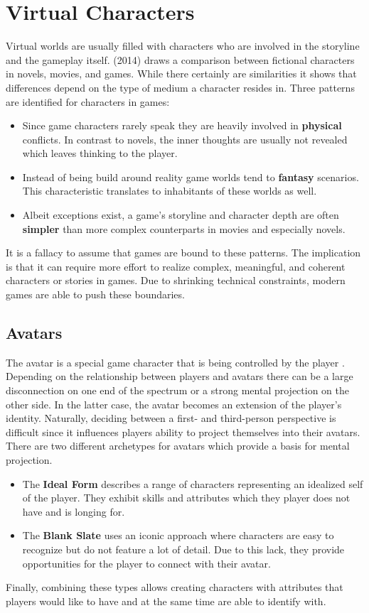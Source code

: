\section{Virtual Characters} \label{sec:virtual-characters}
Virtual worlds are usually filled with characters who are involved in the storyline and the gameplay itself.
\citeauthor{Schell2014} (2014) draws a comparison between fictional characters in novels, movies, and games.
While there certainly are similarities it shows that differences depend on the type of medium a character resides in.
Three patterns are identified for characters in games:
\begin{itemize}
    \item Since game characters rarely speak they are heavily involved in \textbf{physical} conflicts. In contrast to novels, the inner thoughts are usually not revealed which leaves thinking to the player.
    \item Instead of being build around reality game worlds tend to \textbf{fantasy} scenarios. This characteristic translates to inhabitants of these worlds as well.
    \item Albeit exceptions exist, a game's storyline and character depth are often \textbf{simpler} than more complex counterparts in movies and especially novels.
\end{itemize}
It is a fallacy to assume that games are bound to these patterns.
The implication is that it can require more effort to realize complex, meaningful, and coherent characters or stories in games.
Due to shrinking technical constraints, modern games are able to push these boundaries.

\subsection{Avatars}
The avatar is a special game character that is being controlled by the player \cite{Schell2014}.
Depending on the relationship between players and avatars there can be a large disconnection on one end of the spectrum or a strong mental projection on the other side.
In the latter case, the avatar becomes an extension of the player's identity.
Naturally, deciding between a first- and third-person perspective is difficult since it influences players ability to project themselves into their avatars.
There are two different archetypes for avatars which provide a basis for mental projection.
\begin{itemize}
    \item The \textbf{Ideal Form} describes a range of characters representing an idealized self of the player. They exhibit skills and attributes which they player does not have and is longing for.
    \item The \textbf{Blank Slate} uses an iconic approach where characters are easy to recognize but do not feature a lot of detail. Due to this lack, they provide opportunities for the player to connect with their avatar.
\end{itemize}
Finally, combining these types allows creating characters with attributes that players would like to have and at the same time are able to identify with.

